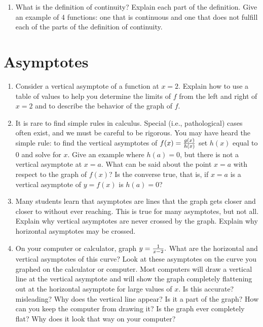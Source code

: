 \begin{enumerate}
\item  What is the definition of continuity?  Explain each part of the definition.  Give an example of 4 functions:  one that is continuous and one that does not fulfill each of the parts of the definition of continuity. 

\end{enumerate}\section{Asymptotes} \begin{enumerate} 

\item  Consider a vertical asymptote of a function at $x = 2$.  Explain how to use a table of values to help you determine the limits of $f$ from the left and right of $x = 2$ and to describe the behavior of the graph of $f$. 

\item  It is rare to find simple rules in calculus.  Special (i.e., pathological) cases often exist, and we must be careful to be rigorous.  You may have heard the simple rule:  to find the vertical asymptotes of $f(x) = {{g(x)} \over {h(x)}}$  set $h(x)$ equal to 0 and solve for $x$.  Give an example where $h(a) = 0$, but there is not a vertical asymptote at $x = a$.  \cite{SM}  What can be said about the point $x = a$ with respect to the graph of $f(x)$?  Is the converse true, that is, if $x = a$ is a vertical asymptote of $y = f(x)$ is $h(a) = 0$? 

\item  Many students learn that asymptotes are lines that the graph gets closer and closer to without ever reaching.  This is true for many asymptotes, but not all.  Explain why vertical asymptotes are never crossed by the graph.  Explain why horizontal asymptotes may be crossed.  \cite{SM} 

\item  On your computer or calculator, graph $y = {1 \over {x - 2}}.$  What are the horizontal and vertical asymptotes of this curve?  Look at these asymptotes on the curve you graphed on the calculator or computer.  Most computers will draw a vertical line at the vertical asymptote and will show the graph completely flattening out at the horizontal asymptote for large values of $x$.  Is this accurate?  misleading?  Why does the vertical line appear?  Is it a part of the graph?  How can you keep the computer from drawing it?  Is the graph ever completely flat?  Why does it look that way on your computer?  \cite{SM} 


\end{enumerate}
